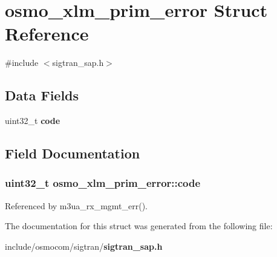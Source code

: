 \section{osmo\+\_\+xlm\+\_\+prim\+\_\+error Struct Reference}
\label{structosmo__xlm__prim__error}


{\ttfamily \#include $<$sigtran\+\_\+sap.\+h$>$}

\subsection*{Data Fields}
\begin{DoxyCompactItemize}
\item 
uint32\+\_\+t {\bf code}
\end{DoxyCompactItemize}


\subsection{Field Documentation}
\subsubsection[{code}]{\setlength{\rightskip}{0pt plus 5cm}uint32\+\_\+t osmo\+\_\+xlm\+\_\+prim\+\_\+error\+::code}\label{structosmo__xlm__prim__error_a7a0a65dd21da82a8a87355773a42bba7}


Referenced by m3ua\+\_\+rx\+\_\+mgmt\+\_\+err().



The documentation for this struct was generated from the following file\+:\begin{DoxyCompactItemize}
\item 
include/osmocom/sigtran/{\bf sigtran\+\_\+sap.\+h}\end{DoxyCompactItemize}
